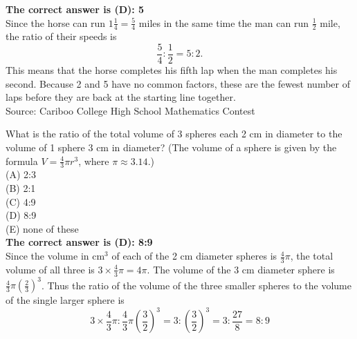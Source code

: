 \documentclass{article}
\begin{document}

\textbf{The correct answer is (D): 5}\\[1 ex]
Since the horse can run $1\frac{1}{4}=\frac{5}{4}$ miles in the same time the man can run $\frac{1}{2}$ mile, the ratio of their speeds is
\begin{equation*}
\frac{5}{4}:\frac{1}{2}=5:2.
\end{equation*}
This means that the horse completes his fifth lap when the man completes his second.  Because 2 and 5 have no common factors, these are the fewest number of laps before they are back at the starting line together.
\\[5 ex]

\scriptsize
Source: Cariboo College High School Mathematics Contest

\normalsize
What is the ratio of the total volume of 3 spheres each 2 cm in diameter to the volume of 1 sphere 3 cm in diameter? (The volume of a sphere is given by the formula $V=\frac{4}{3}\pi r^3$, where $\pi\approx 3.14$.)\\
(A) 2:3\\
(B) 2:1\\
(C) 4:9\\
(D) 8:9\\
(E) none of these\\


\textbf{The correct answer is (D): 8:9}\\[1 ex]
Since the volume in $\mathrm{cm}^3$ of each of the 2 cm diameter spheres is $\frac{4}{3}\pi$, the total volume of all three is $3\times\frac{4}{3}\pi=4\pi$.
The volume of the 3 cm diameter sphere is $\frac{4}{3}\pi(\frac{2}{3})^3$. Thus the ratio of the volume of the three smaller spheres to the volume of the single larger sphere is
\begin{equation*}
3\times\frac{4}{3}\pi:\frac{4}{3}\pi(\frac{3}{2})^3=3:(\frac{3}{2})^3=3:\frac{27}{8}=8:9
\end{equation*}
\\[5 ex]
\end{document}
